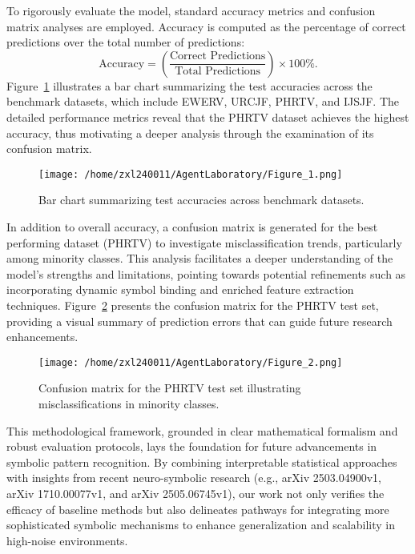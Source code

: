 \documentclass{article}
\begin{document}
To rigorously evaluate the model, standard accuracy metrics and confusion matrix analyses are employed. Accuracy is computed as the percentage of correct predictions over the total number of predictions:
\[
\text{Accuracy} = \left( \frac{\text{Correct Predictions}}{\text{Total Predictions}} \right) \times 100\%.
\]
Figure~\ref{fig:fig1} illustrates a bar chart summarizing the test accuracies across the benchmark datasets, which include EWERV, URCJF, PHRTV, and IJSJF. The detailed performance metrics reveal that the PHRTV dataset achieves the highest accuracy, thus motivating a deeper analysis through the examination of its confusion matrix.

\begin{figure}[h]
\caption{Bar chart summarizing test accuracies across benchmark datasets.}
\centering
\texttt{[image: /home/zxl240011/AgentLaboratory/Figure\_1.png]}
\label{fig:fig1}
\end{figure}

In addition to overall accuracy, a confusion matrix is generated for the best performing dataset (PHRTV) to investigate misclassification trends, particularly among minority classes. This analysis facilitates a deeper understanding of the model's strengths and limitations, pointing towards potential refinements such as incorporating dynamic symbol binding and enriched feature extraction techniques. Figure~\ref{fig:fig2} presents the confusion matrix for the PHRTV test set, providing a visual summary of prediction errors that can guide future research enhancements.

\begin{figure}[h]
\caption{Confusion matrix for the PHRTV test set illustrating misclassifications in minority classes.}
\centering
\texttt{[image: /home/zxl240011/AgentLaboratory/Figure\_2.png]}
\label{fig:fig2}
\end{figure}

This methodological framework, grounded in clear mathematical formalism and robust evaluation protocols, lays the foundation for future advancements in symbolic pattern recognition. By combining interpretable statistical approaches with insights from recent neuro-symbolic research (e.g., arXiv 2503.04900v1, arXiv 1710.00077v1, and arXiv 2505.06745v1), our work not only verifies the efficacy of baseline methods but also delineates pathways for integrating more sophisticated symbolic mechanisms to enhance generalization and scalability in high-noise environments.
\end{document}
